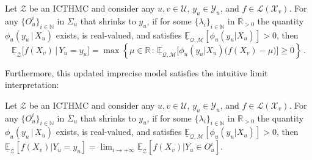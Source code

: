 \documentclass[twoside,11pt]{article}
\newcommand{\nats}{\mathbb{N}}
\newcommand{\reals}{\mathbb{R}}
\newcommand{\realspos}{\reals_{>0}}
\newcommand{\states}{\mathcal{X}}
\newcommand{\observs}{\mathcal{Y}}
\newcommand{\lexp}{\underline{\mathbb{E}}_{\rateset,\mathcal{M}}}
\newcommand{\gambles}{\mathcal{L}}
\newcommand{\rateset}{\mathcal{Q}}
\begin{document}
\begin{proposition}\label{prop:GBR_for_densities_lower_zero}
Let $\mathcal{Z}$ be an ICTHMC and consider any $u,v\in\mathcal{U}$, $y_u\in\observs_u$, and $f\in\gambles(\states_v)$. For any $\{O_u^i\}_{i\in\nats}$ in $\Sigma_u$ that shrinks to $y_u$, if for some $\{\lambda_i\}_{i\in\nats}$ in $\realspos$ the quantity $\phi_u(y_u\,\vert\,X_u)$ exists, is real-valued, and satisfies $\lexp[\phi_u(y_u\vert X_u)]>0$, then
\begin{equation}\label{eq:gbr_densities}
\underline{\mathbb{E}}_{\mathcal{Z}}\bigl[f(X_v)\,\vert\,Y_u = y_u\bigr] = \max\left\{\mu\in\reals\,:\, \lexp\bigl[\phi_u(y_u\vert X_u)\bigl(f(X_v) - \mu\bigr)\bigr] \geq 0\right\}\,.
\end{equation}
\end{proposition}
Furthermore, this updated imprecise model satisfies the intuitive limit interpretation:
\begin{proposition}\label{prop:GBR_for_densities_is_limit_if_continuous}
Let $\mathcal{Z}$ be an ICTHMC and consider any $u,v\in\mathcal{U}$, $y_u\in\observs_u$, and $f\in\gambles(\states_v)$. For any $\{O_u^i\}_{i\in\nats}$ in $\Sigma_u$ that shrinks to $y_u$, if for some $\{\lambda_i\}_{i\in\nats}$ in $\realspos$ the quantity $\phi_u(y_u\,\vert\,X_u)$ exists, is real-valued, and satisfies $\lexp[\phi_u(y_u\vert X_u)]>0$, then $\underline{\mathbb{E}}_\mathcal{Z}[f(X_v)\vert Y_u=y_u] 
 = \lim_{i\to+\infty}\underline{\mathbb{E}}_\mathcal{Z}[f(X_v)\vert Y_u\in O_u^i]$.
\end{proposition}
\end{document}
